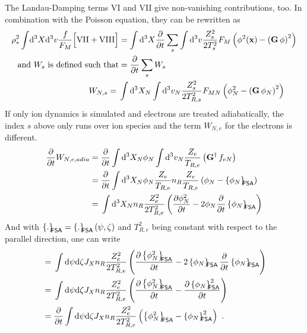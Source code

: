 The Landau-Damping terms VI and VII give non-vanishing contributions,
too. In combination with the Poisson equation, they can be
rewritten as
\begin{align}
  \rho_*^2\int\!\mathrm{d}^3X\mathrm{d}^3v\frac{f}{F_M}\Big[\mathrm{VII} + \mathrm{VIII}\Big] &= \int\mathrm{d}^3X \frac{\partial }{\partial t} \sum_s\int\mathrm{d}^3v \frac{Z_s^2}{2T_s^2}F_M\left(\phi^2(\mathbf{x}) - \left(\mathbf{G}\, \phi\right)^2 \right) \\
 \text{and $W_s$ is defined such that} &= \frac{\partial }{\partial t}\sum_sW_s \\
 W_{N,s} = {}& \int\mathrm{d}^3X_N \int\mathrm{d}^3v_N \frac{Z_s^2}{2T_{R,s}^2}F_{MN}\left(\phi_N^2 -  \left(\mathbf{G}\, \phi_N\right)^2\right)   \label{eq:W}
\end{align}
If only ion dynamics is simulated and electrons are treated
adiabatically, the index $s$ above only runs over ion species and the
term $W_{N,e}$ for the electrons is different.
\begin{align}
\frac{\partial }{\partial t}W_{N,e,adia}
{}={}& \frac{\partial }{\partial t}\int\mathrm{d}^3X_N \phi_N \int\mathrm{d}^3v_N\frac{Z_e}{T_{R,e}}\left(\mathbf{G}^\dagger\, f_{eN}\right) \nonumber\\
{}={}& \frac{\partial }{\partial t}\int\mathrm{d}^3X_N \phi_N \frac{Z_e}{T_{R,e}}n_R\frac{Z_e}{T_{R,e}}\left(\phi_N - \left\{ \phi_N\right\}_{\!\!\text{\textsf{FSA}}} \right) \nonumber\\
{}={}& \int\mathrm{d}^3X_N  n_R\frac{Z_e^2}{2T_{R,e}^2}\left(
 \frac{\partial \phi_N^2}{\partial t} - 2\phi_N\frac{\partial }{\partial t}\left\{ \phi_N\right\}_{\!\!\text{\textsf{FSA}}}
 \right)
\end{align}
And with $\left\{ .\right\}_{\!\!\text{\textsf{FSA}}}=\left\{ .\right\}_{\!\!\text{\textsf{FSA}}}(\psi,\zeta)$ and $T_{R,e}^2$ being constant
with respect to the parallel direction, one can write
\begin{align}
{}={}& \int\ud\psi\ud\zeta J_X   n_R\frac{Z_e^2}{2T_{R,e}^2}\left(
\pd{\fsa{\phi_N^2}}{t} -
 2\fsa{\phi_N}\pd{}{t}\fsa{\phi_N}
 \right)\\
{}={}& \int\ud\psi\ud\zeta J_X   n_R\frac{Z_e^2}{2T_{R,e}^2}\left(
 \pd{\fsa{\phi_N^2}}{t} -
\pd{\fsa{\phi_N}^2}{t}
  \right) \\
{}={}& \pd{}{t}\int\ud\psi\ud\zeta J_X  n_R\frac{Z_e^2}{2T_{R,e}^2}\left(
  \fsa{\phi_N^2} -
 \fsa{\phi_N}^2 
\right) 
\ .
\label{eq:W-corr-adia}
\end{align}



